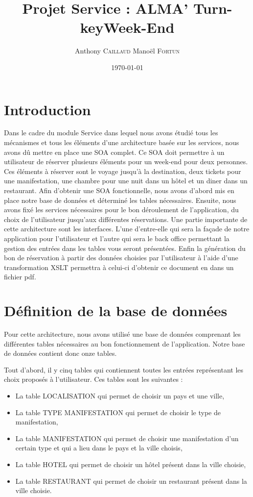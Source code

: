 \documentclass[11pt,a4paper]{article}
\title{Projet Service : ALMA' Turn-keyWeek-End}
\author{Anthony \textsc{Caillaud} Manoël \textsc{Fortun}}
\date{\today}
\begin{document}
\maketitle


\clearpage
\tableofcontents
\clearpage
\section{Introduction}

Dans le cadre du module Service dans lequel nous avons étudié tous les
mécanismes et tous les éléments d'une architecture basée sur les services, nous
avons dû mettre en place une SOA complet. Ce SOA doit permettre à un utilisateur
de réserver plusieurs éléments pour un week-end pour deux personnes. Ces
éléments à réserver sont le voyage jusqu'à la destination, deux tickets pour
une manifestation, une chambre pour une nuit dans un hôtel et un diner dans un
restaurant. Afin d'obtenir une SOA fonctionnelle, nous avons d'abord mis en
place notre base de données et déterminé les tables nécessaires. Ensuite, nous
avons fixé les services nécessaires pour le bon déroulement de l'application, du
choix de l'utilisateur jusqu'aux différentes réservations. Une partie
importante de cette architecture sont les interfaces. L'une
d'entre-elle qui sera la façade de notre application pour l'utilisateur et
l'autre qui sera le back office permettant la gestion des entrées dans les
tables vous seront présentées. Enfin la génération du bon de réservation à
partir des données choisies par l'utilisateur à l'aide d'une transformation
XSLT permettra à celui-ci d'obtenir ce document en dans un fichier pdf.


\section{Définition de la base de données}
Pour cette architecture, nous avons utilisé une base de données comprenant les
différentes tables nécessaires au bon fonctionnement de l'application. Notre
base de données contient donc onze tables.

Tout d'abord, il y cinq tables qui contiennent toutes les entrées représentant
les choix proposés à l'utilisateur. Ces tables sont les suivantes :\\

\begin{itemize}
  \item La table LOCALISATION qui permet de choisir un pays et une ville,
  \item La table TYPE MANIFESTATION qui permet de choisir le type de
  manifestation,
  \item La table MANIFESTATION qui permet de choisir une manifestation d'un
  certain type et qui a lieu dans le pays et la ville choisis,
  \item La table HOTEL qui permet de choisir un hôtel présent dans la ville
  choisie,
  \item La table RESTAURANT qui permet de choisir un restaurant présent dans la
  ville choisie.\\
\end{itemize}
 
\end{document}
